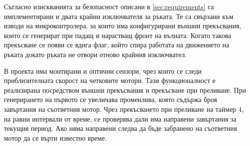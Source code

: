 Съгласно изискванията за безопасност описани в \cref{sec:requirements} са имплементирани и двата крайни изключвателя за ръката. Те са свързани към изводи на микроконтролера, за които има конфигурирани външни прекъсвания, които се генерират при падащ и нарастващ фронт на вълната. Когато такова прекъсване се появи се вдига флаг, който спира работата на движението на ръката докато ръката не отвори отново крайния изключвател. 



В проекта има монтирани и оптични сензори, чрез които се следи приблизителната скорост на четковите мотори. Тази функционалност е реализирана посредством външни прекъсвания и прекъсване при преливане. При генерирането на първото се увеличава променлива, която съдържа броя завъртания на съответния мотор. Чрез прекъсването при преливане на таймер 4, на равни интервали от време, се проверява дали има направени завъртания за текущия период. Ако няма направени следва да бъде забранено на съответния мотор да се върти известно време.


